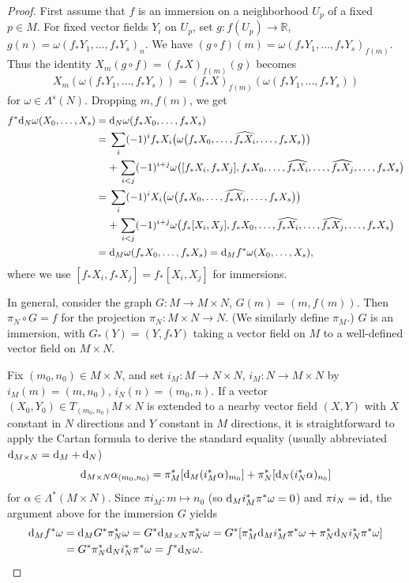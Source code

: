 \documentclass[10pt,a4paper]{amsart}
\numberwithin{equation}{section}
\theoremstyle{definition}
\newcommand{\BbR}{{\mathbb R}}
\newcommand{\R}{\BbR}
\begin{document}
 \begin{proof} First assume that $f$ is an immersion on a neighborhood $U_p$ of a fixed $p\in M$.
For fixed vector fields $Y_i$ on $U_p$, set
 $g\colon f(U_p)\to \R$, $g(n) = \omega(f_*Y_1,\dots, f_*Y_s)_{n}$.
We have $(g\circ f)(m) = \omega(f_*Y_1,\dots, f_*Y_s)_{f(m)}$. Thus the identity $X_m(g\circ f) = (f_*X)
_{f(m)}(g)$
becomes
\[X_m(\omega(f_*Y_1,\dots, f_*Y_s)) = (f_*X)_{f(m)}(\omega(f_*Y_1,\dots, f_*Y_s))\]
for $\omega \in \Lambda^s(N)$.
Dropping $m, f(m)$, we get
\begin{align*}f^* {\rm d}_N\omega(X_0,\dots, X_{s})={}& {\rm d}_N\omega(f_*X_0,\dots, f_*X_{s})\\
={}&\sum_i (-1)^i f_*X_i \bigl( \omega\bigl(f_*X_0,\dots,\widehat{f_*X_i},\dots, f_*X_{s}\bigr)\bigr)\\
&
{+}\, \sum_{i<j} (-1)^{i+j}\omega\bigl([f_*X_i,f_*X_j], f_*X_0,\dots, \widehat{f_*X_i},\dots, \widehat{f_*X_j},\dots,f_*X_{s}\bigr)\\
={}& \sum_i (-1)^i X_i \bigl( \omega\bigl(f_*X_0,\dots,\widehat{f_*X_i},\dots, f_*X_{s}\bigr)\bigr)\\
&
{+}\, \sum_{i<j} (-1)^{i+j}\omega\bigl(f_*[X_i,X_j], f_*X_0,\dots, \widehat{f_*X_i},\dots, \widehat{f_*X_j},\dots,f_*X_{s}\bigr)\\
={}& {\rm d}_M \omega (f_*X_0,\dots, f_*X_s) = {\rm d}_Mf^*\omega(X_0,\dots,X_s),
\end{align*}
where we use $[f_*X_i,f_*X_j] = f_*[X_i,X_j]$ for immersions.

In general,
consider the graph $G\colon M\to M\times N$, $G(m) = (m, f(m))$. Then $\pi_N\circ G = f$ for the projection $\pi_N\colon M\times N\to N$. (We similarly define $\pi_M$.)
$G$ is an immersion, with $G_*(Y) = (Y, f_*Y)$ taking a vector field on $M$ to a well-defined vector field on $M\times N$.

Fix $(m_0, n_0)\in M\times N$, and set $i_M\colon M\to N\times N$, $i_M\colon N\to M\times N$ by
$i_M(m) = (m, n_0)$, $i_N(n) = (m_0,n)$. If a vector $(X_0,Y_0)\in T_{(m_0,n_0)}M\times N$
is extended to a nearby vector field $(X,Y)$ with $X$ constant in $N$ directions and $Y$ constant in $M$ directions,
it is straightforward to apply the Cartan formula to derive the standard equality (usually abbreviated
$ {\rm d}_{M\times N} = {\rm d}_M + {\rm d}_N$)
\[ {\rm d}_{M\times N}\alpha_{(m_0,n_0)} = \pi_M^*[ {\rm d}_M (i_M^*\alpha)_{m_0}] + \pi_N^*[ {\rm d}_N (i_N^*\alpha)_{n_0}] \]
for $\alpha\in \Lambda^*(M\times N)$.
Since $\pi i_M\colon m\mapsto n_0$ (so ${\rm d}_Mi_M^*\pi^*\omega = 0$) and $\pi i_N = {\rm id}$, the argument above for the immersion $G$ yields
\begin{align*} {\rm d}_Mf^*\omega &= {\rm d}_M G^*\pi_N^*\omega = G^* {\rm d}_{M\times N}\pi_N^*\omega
= G^*[\pi_M^* {\rm d}_M i_M^*\pi^*\omega + \pi_N^* {\rm d}_N i_N^*\pi^*\omega] \\
&= G^*\pi_N^* {\rm d}_N i_N^*\pi^*\omega = f^* {\rm d}_N \omega.\tag*{\qed}
\end{align*}
\renewcommand{\qed}{}
\end{proof}
\end{document}

